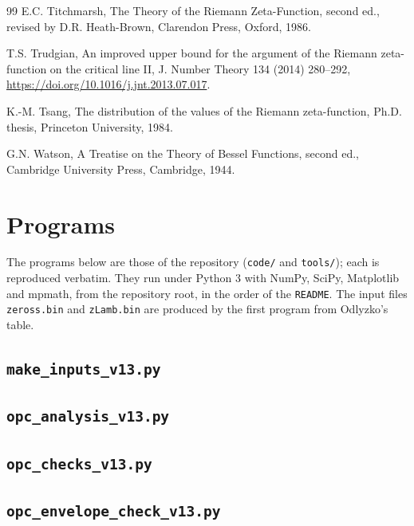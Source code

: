\documentclass[preprint,12pt]{elsarticle}
\numberwithin{equation}{section}
\theoremstyle{plain}
\theoremstyle{definition}
\theoremstyle{remark}
\begin{document}
\begin{thebibliography}{99}
E.C. Titchmarsh, The Theory of the Riemann Zeta-Function, second ed., revised by D.R. Heath-Brown, Clarendon Press, Oxford, 1986.

T.S. Trudgian, An improved upper bound for the argument of the Riemann zeta-function on the critical line II, J. Number Theory 134 (2014) 280--292, \href{https://doi.org/10.1016/j.jnt.2013.07.017}{https://doi.org/10.1016/j.jnt.2013.07.017}.

K.-M. Tsang, The distribution of the values of the Riemann zeta-function, Ph.D. thesis, Princeton University, 1984.

G.N. Watson, A Treatise on the Theory of Bessel Functions, second ed., Cambridge University Press, Cambridge, 1944.

\end{thebibliography}

\appendix
\section{Programs}
\label{app:programs}
The programs below are those of the repository (\texttt{code/} and \texttt{tools/}); each is reproduced verbatim. They run under Python 3 with NumPy, SciPy, Matplotlib and mpmath, from the repository root, in the order of the \texttt{README}. The input files \texttt{zeross.bin} and \texttt{zLamb.bin} are produced by the first program from Odlyzko's table.

\subsection{\texttt{make\_inputs\_v13.py}}


\subsection{\texttt{opc\_analysis\_v13.py}}


\subsection{\texttt{opc\_checks\_v13.py}}


\subsection{\texttt{opc\_envelope\_check\_v13.py}}

\end{document}
